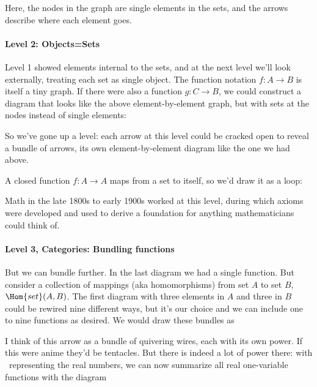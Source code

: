 \documentclass[11pt]{article}
\begin{document}
Here, the nodes in the graph are single elements in the sets, and the arrows describe
where each element goes.

\paragraph{Level 2: Objects=Sets}
Level 1 showed elements internal to the sets, and at the next level we'll look externally,
treating each set as single object.
The function notation $f:A\to B$ is itself a tiny graph. If there were also a function
$g:C\to B$, we could construct a diagram that looks like the above element-by-element graph, but with sets at the nodes instead of single elements:

So we've gone up a level: each arrow at this level could be cracked open to reveal
a bundle of arrows, its own element-by-element diagram like the one we had above.

A closed function $f:A\to A$ maps from a set to itself, so we'd draw it as a loop:


Math in the late 1800s to early 1900s worked at this level, during which axioms
were developed and used to derive a foundation for anything mathematicians could think of.

\paragraph{Level 3, Categories: Bundling functions}
But we can bundle further. In the last
diagram we had a single function. But consider a collection of mappings (aka homomorphisms)
from set $A$ to set $B$, $\Hom{set}(A, B)$.
The first diagram with three elements in $A$ and
three in $B$ could be rewired nine different ways, but it's our choice and we can include
one to nine functions as desired.  We would draw these
bundles as

I think of this arrow as a bundle of quivering wires, each with its own power. If this were anime
they'd be tentacles. But there is indeed a lot of power there: with \Re\ representing the
real numbers, we can now summarize all real one-variable functions with the diagram 
\end{document}
